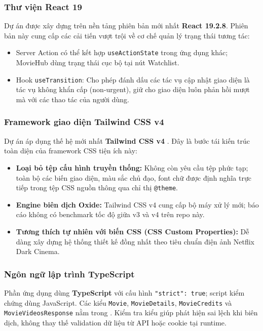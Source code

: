 \documentclass[12pt,a4paper]{extarticle}
\begin{document}
\subsubsection{Thư viện React 19}
Dự án được xây dựng trên nền tảng phiên bản mới nhất \textbf{React 19.2.8}. Phiên bản này cung cấp các cải tiến vượt trội về cơ chế quản lý trạng thái tương tác:
\begin{itemize}[noitemsep]
    \item Server Action có thể kết hợp \texttt{useActionState} trong ứng dụng khác; MovieHub dùng trạng thái cục bộ tại nút Watchlist.
    \item Hook \texttt{useTransition}: Cho phép đánh dấu các tác vụ cập nhật giao diện là tác vụ không khẩn cấp (non-urgent), giữ cho giao diện luôn phản hồi mượt mà với các thao tác của người dùng.
\end{itemize}

\subsubsection{Framework giao diện Tailwind CSS v4}
Dự án áp dụng thế hệ mới nhất \textbf{Tailwind CSS v4} \cite{tailwind_docs}. Đây là bước tái kiến trúc toàn diện của framework CSS tiện ích này:
\begin{itemize}[noitemsep]
    \item \textbf{Loại bỏ tệp cấu hình truyền thống:} Không còn yêu cầu tệp  phức tạp; toàn bộ các biến giao diện, màu sắc chủ đạo, font chữ được định nghĩa trực tiếp trong tệp CSS nguồn thông qua chỉ thị \texttt{@theme}.
    \item \textbf{Engine biên dịch Oxide:} Tailwind CSS v4 cung cấp bộ máy xử lý mới; báo cáo không có benchmark tốc độ giữa v3 và v4 trên repo này.
    \item \textbf{Tương thích tự nhiên với biến CSS (CSS Custom Properties):} Dễ dàng xây dựng hệ thống thiết kế đồng nhất theo tiêu chuẩn điện ảnh Netflix Dark Cinema.
\end{itemize}

\subsubsection{Ngôn ngữ lập trình TypeScript}
Phần ứng dụng dùng \textbf{TypeScript} \cite{typescript_handbook} với cấu hình \texttt{"strict": true}; script kiểm chứng dùng JavaScript. Các kiểu \texttt{Movie}, \texttt{MovieDetails}, \texttt{MovieCredits} và \texttt{MovieVideosResponse} nằm trong . Kiểm tra kiểu giúp phát hiện sai lệch khi biên dịch, không thay thế validation dữ liệu từ API hoặc cookie tại runtime.
\end{document}
